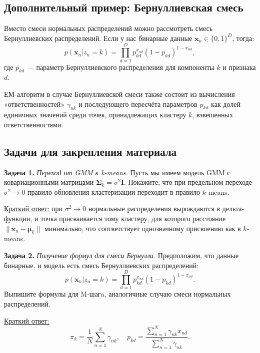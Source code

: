 \subsection{Дополнительный пример: Бернуллиевская смесь}

Вместо смеси нормальных распределений можно рассмотреть смесь Бернуллиевских распределений. Если у нас бинарные данные $\mathbf{x}_n \in \{0,1\}^D$, тогда:
\begin{equation*}
p(\mathbf{x}_n | z_n = k) = \prod_{d=1}^D p_{kd}^{x_{nd}} (1 - p_{kd})^{1 - x_{nd}},
\end{equation*}
где $p_{kd}$ --- параметр Бернуллиевского распределения для компоненты $k$ и признака $d$.

ЕМ-алгоритм в случае Бернуллиевской смеси также состоит из вычисления «ответственностей» $\gamma_{nk}$ и последующего пересчёта параметров $p_{kd}$ как долей единичных значений среди точек, принадлежащих кластеру $k$, взвешенных ответственностями.

\subsection{Задачи для закрепления материала}

\noindent\textbf{Задача 1.} \emph{Переход от GMM к k-means.}  
Пусть мы имеем модель GMM с ковариационными матрицами $\boldsymbol{\Sigma}_k = \sigma^2 \mathbf{I}$. Покажите, что при предельном переходе $\sigma^2 \to 0$ правило обновления кластеризации переходит в правило $k$-means. 

\underline{Краткий ответ:} при $\sigma^2 \to 0$ нормальные распределения вырождаются в дельта-функции, и точка присваивается тому кластеру, для которого расстояние $\|\mathbf{x}_n - \boldsymbol{\mu}_k\|$ минимально, что соответствует однозначному присвоению как в $k$-means.

\noindent\textbf{Задача 2.} \emph{Получение формул для смеси Бернулли.}  
Предположим, что данные бинарные, и модель есть смесь Бернуллиевских распределений:
\begin{equation*}
p(\mathbf{x}_n | z_n = k) = \prod_{d=1}^D p_{kd}^{x_{nd}}(1 - p_{kd})^{1-x_{nd}}.
\end{equation*}
Выпишите формулы для M-шагa, аналогичные случаю смеси нормальных распределений.

\underline{Краткий ответ:}
\begin{equation*}
\pi_k = \frac{1}{N}\sum_{n=1}^N \gamma_{nk}, \quad p_{kd} = \frac{\sum_{n=1}^N \gamma_{nk} x_{nd}}{\sum_{n=1}^N \gamma_{nk}}.
\end{equation*}

